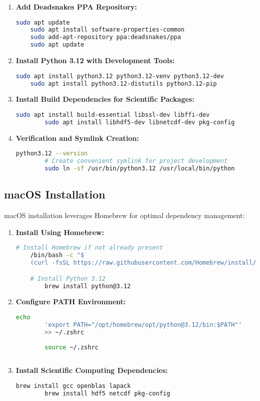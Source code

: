 \begin{enumerate}
	\item \textbf{Add Deadsnakes PPA Repository:}
	\begin{lstlisting}[language=bash]
	sudo apt update
	sudo apt install software-properties-common
	sudo add-apt-repository ppa:deadsnakes/ppa
	sudo apt update
	\end{lstlisting}
	\item \textbf{Install Python 3.12 with Development Tools:}
	\begin{lstlisting}[language=bash]
	sudo apt install python3.12 python3.12-venv python3.12-dev
	sudo apt install python3.12-distutils python3.12-pip
	\end{lstlisting}
	\item \textbf{Install Build Dependencies for Scientific Packages:}
	\begin{lstlisting}[language=bash]
		sudo apt install build-essential libssl-dev libffi-dev
		sudo apt install libhdf5-dev libnetcdf-dev pkg-config
	\end{lstlisting}
	\item \textbf{Verification and Symlink Creation:}
	\begin{lstlisting}[language=bash]
		python3.12 --version
		# Create convenient symlink for project development
		sudo ln -sf /usr/bin/python3.12 /usr/local/bin/python
	\end{lstlisting}
\end{enumerate}

\subsection{macOS Installation}

macOS installation leverages Homebrew for optimal dependency management:

\begin{enumerate}
	\item \textbf{Install Using Homebrew:}
	\begin{lstlisting}[language=bash]
	# Install Homebrew if not already present
	/bin/bash -c "$
	(curl -fsSL https://raw.githubusercontent.com/Homebrew/install/HEAD/install.sh)"

	# Install Python 3.12
		brew install python@3.12
	\end{lstlisting}
	\item \textbf{Configure PATH Environment:}
	\begin{lstlisting}[language=bash]
		echo 
		'export PATH="/opt/homebrew/opt/python@3.12/bin:$PATH"'
		>> ~/.zshrc
		
		source ~/.zshrc
		
	\end{lstlisting}
	\item \textbf{Install Scientific Computing Dependencies:}
	\begin{lstlisting}[language=bash]
		brew install gcc openblas lapack
		brew install hdf5 netcdf pkg-config
		
	\end{lstlisting}
\end{enumerate}

